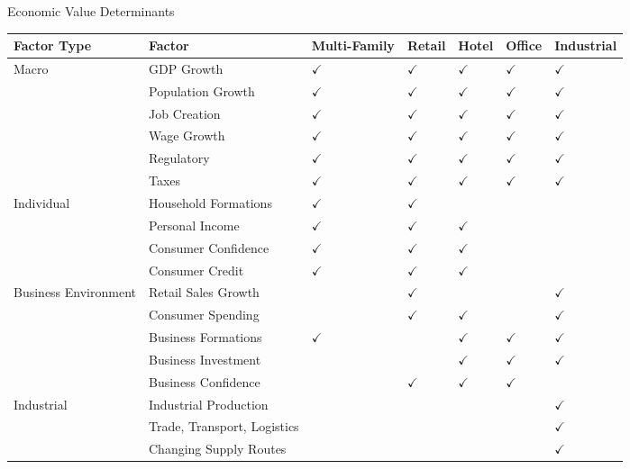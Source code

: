 \begin{flushleft}
Economic Value Determinants
\begin{tabularx}{\textwidth}{p{10em}|p{12em}|p{6em}|p{2.5em}|p{2.5em}|p{2.5em}|p{4.5em}}
\hline
\rowcolor{gray!30}
Factor Type & Factor & Multi-Family & Retail & Hotel & Office & Industrial \\
\hline
Macro & GDP Growth & $\checkmark$ & $\checkmark$ & $\checkmark$ & $\checkmark$ & $\checkmark$ \\
& Population Growth & $\checkmark$ & $\checkmark$ & $\checkmark$ & $\checkmark$ & $\checkmark$ \\
& Job Creation & $\checkmark$ & $\checkmark$ & $\checkmark$ & $\checkmark$ & $\checkmark$ \\
& Wage Growth & $\checkmark$ & $\checkmark$ & $\checkmark$ & $\checkmark$ & $\checkmark$ \\
& Regulatory & $\checkmark$ & $\checkmark$ & $\checkmark$ & $\checkmark$ & $\checkmark$ \\
& Taxes & $\checkmark$ & $\checkmark$ & $\checkmark$ & $\checkmark$ & $\checkmark$ \\
\hline
Individual & Household Formations & $\checkmark$ & $\checkmark$ & & & \\
& Personal Income & $\checkmark$ & $\checkmark$ & $\checkmark$ & & \\
& Consumer Confidence & $\checkmark$ & $\checkmark$ & $\checkmark$ & & \\
& Consumer Credit & $\checkmark$ & $\checkmark$ & $\checkmark$ & & \\
\hline
Business Environment & Retail Sales Growth & & $\checkmark$ & & & $\checkmark$ \\
& Consumer Spending & & $\checkmark$ & $\checkmark$ & & $\checkmark$ \\
& Business Formations & $\checkmark$ & & $\checkmark$ & $\checkmark$ & $\checkmark$ \\
& Business Investment & & & $\checkmark$ & $\checkmark$ & $\checkmark$ \\
& Business Confidence & & $\checkmark$ & $\checkmark$ & $\checkmark$ \\
\hline
Industrial & Industrial Production & & & & & $\checkmark$ \\
& Trade, Transport, Logistics & & & & & $\checkmark$ \\
& Changing Supply Routes & & & & & $\checkmark$ \\
\hline
\end{tabularx}
\end{flushleft}

